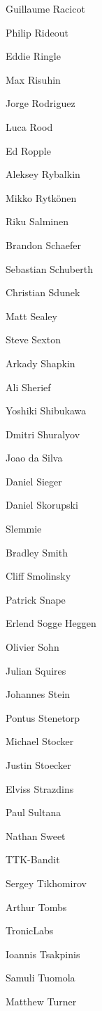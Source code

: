\begin{DoxyItemize}
\item Guillaume Racicot
\item Philip Rideout
\item Eddie Ringle
\item Max Risuhin
\item Jorge Rodriguez
\item Luca Rood
\item Ed Ropple
\item Aleksey Rybalkin
\item Mikko Rytkönen
\item Riku Salminen
\item Brandon Schaefer
\item Sebastian Schuberth
\item Christian Sdunek
\item Matt Sealey
\item Steve Sexton
\item Arkady Shapkin
\item Ali Sherief
\item Yoshiki Shibukawa
\item Dmitri Shuralyov
\item Joao da Silva
\item Daniel Sieger
\item Daniel Skorupski
\item Slemmie
\item Bradley Smith
\item Cliff Smolinsky
\item Patrick Snape
\item Erlend Sogge Heggen
\item Olivier Sohn
\item Julian Squires
\item Johannes Stein
\item Pontus Stenetorp
\item Michael Stocker
\item Justin Stoecker
\item Elviss Strazdins
\item Paul Sultana
\item Nathan Sweet
\item TTK-\/\+Bandit
\item Sergey Tikhomirov
\item Arthur Tombs
\item Tronic\+Labs
\item Ioannis Tsakpinis
\item Samuli Tuomola
\item Matthew Turner

\end{DoxyItemize}

